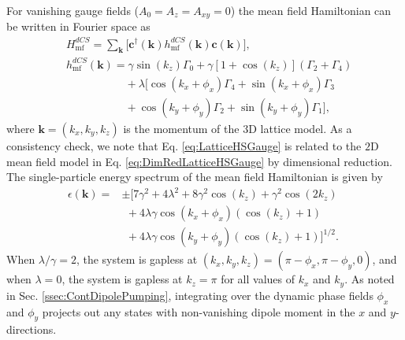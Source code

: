 \documentclass[prb,aps,twocolumn,groupaddress,floatfix]{revtex4-1}
\begin{document}
For vanishing gauge fields ($A_0 = A_z = A_{xy} = 0$) the mean field Hamiltonian can be written in Fourier space as
\begin{equation}
\begin{split}
&H^{dCS}_{\text{mf}} = \sum_{\bm{k}} \Big[\bm{c}^\dagger(\bm{k}) h^{dCS}_{\text{mf}}(\bm{k}) \bm{c}(\bm{k})\Big], \\
&h^{dCS}_{\text{mf}}(\bm{k}) = \gamma \sin(k_z) \Gamma_0 +\gamma[1+\cos(k_z)] (\Gamma_2+\Gamma_4) \\
&\phantom{====}+ \lambda \big[\cos(k_x+\phi_{x})\Gamma_4 + \sin(k_x + \phi_{x}) \Gamma_3\\
&\phantom{====}+ \cos(k_y+\phi_{y})\Gamma_2 + \sin(k_y + \phi_{y}) \Gamma_1\big],
\end{split}\label{eq:LatticeHSGauge}
\end{equation}
where $\bm{k} = (k_x, k_y,k_z)$ is the momentum of the $3$D lattice model. As a consistency check, we note that Eq. \ref{eq:LatticeHSGauge} is related to the $2$D mean field model in Eq. \ref{eq:DimRedLatticeHSGauge} by dimensional reduction.  The single-particle energy spectrum of the mean field Hamiltonian is given by 
\begin{equation}
\begin{split}
\epsilon(\bm{k}) = &\pm \big[ 7\gamma^2 + 4\lambda^2 + 8\gamma^2\cos(k_z) + \gamma^2\cos(2k_z) \phantom{\big) }\\ &\phantom{\big( } + 4
\lambda \gamma \cos(k_x+\phi_x)(\cos(k_z)+1)\phantom{\big) }\\ &\phantom{\big( } + 4
\lambda \gamma \cos(k_y+\phi_y)(\cos(k_z)+1) \big]^{1/2}.
\end{split}
\end{equation} 
When $\lambda/\gamma = 2$, the system is gapless at $(k_x,k_y,k_z) = (\pi-\phi_x,\pi-\phi_y,0)$, and when $\lambda = 0$, the system is gapless at $k_z = \pi$ for all values of $k_x$ and $k_y$. As noted in Sec. \ref{ssec:ContDipolePumping}, integrating over the dynamic phase fields $\phi_x$ and $\phi_y$ projects out any states with non-vanishing dipole moment in the $x$ and $y$-directions. 
\end{document}
